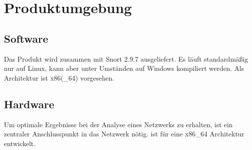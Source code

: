 \chapter{Produktumgebung}

\section{Software}
Das Produkt wird zusammen mit Snort 2.9.7 ausgeliefert. Es läuft standardmäßig nur auf Linux, kann aber unter Umständen auf Windows kompiliert werden. Als Architektur ist x86(\_64) vorgesehen.

\section{Hardware}
Um optimale Ergebnisse bei der Analyse eines Netzwerks zu erhalten, ist ein zentraler Anschlusspunkt in das Netzwerk nötig.
\programname ist für eine x86\_64 Architektur entwickelt. 
